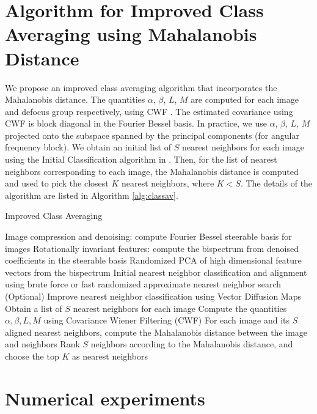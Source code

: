 \documentclass{article}
\begin{document}
\section{Algorithm for Improved Class Averaging using Mahalanobis Distance}

We propose an improved class averaging algorithm that incorporates the Mahalanobis distance. The quantities $\alpha$, $\beta$, $L$, $M$ are computed for each image and defocus group respectively, using CWF \cite{cwf}. The estimated covariance using CWF is block diagonal in the Fourier Bessel basis. In practice, we use $\alpha$, $\beta$, $L$, $M$ projected onto the subspace spanned by the principal components (for angular frequency block). We obtain an initial list of $S$ nearest neighbors for each image using the Initial Classification algorithm in \cite{zhao1}. Then, for the list of nearest neighbors corresponding to each image, the Mahalanobis distance is computed and used to pick the closest $K$ nearest neighbors, where $K<S$. The details of the algorithm are listed in Algorithm \ref{alg:classav}.

\begin{algorithm}
\caption{Improved Class Averaging }
\label{alg:classav}
\begin{algorithmic}[1]
\State Image compression and denoising: compute Fourier Bessel steerable basis for images \cite{ffbspca}
\State Rotationally invariant features: compute the bispectrum from denoised coefficients in the steerable basis
\State Randomized PCA\cite{rokhlin} of high dimensional feature vectors from the bispectrum
\State Initial nearest neighbor classification and alignment using brute force or fast randomized approximate nearest neighbor search \cite{fastnn}
\State (Optional) Improve nearest neighbor classification using Vector Diffusion Maps \cite{vdm}
\State Obtain a list of $S$ nearest neighbors for each image
\EndProcedure
{}
\State Compute the quantities $\alpha, \beta, L, M$ using Covariance Wiener Filtering (CWF) \cite{cwf}
\State For each image and its $S$ aligned nearest neighbors, compute the Mahalanobis distance between the image and neighbors
\State Rank $S$ neighbors according to the Mahalanobis distance, and choose the top $K$ as nearest neighbors
\EndProcedure
\end{algorithmic}
\end{algorithm}


\section{Numerical experiments}
\end{document}
